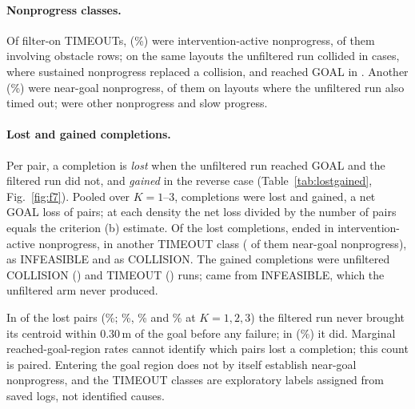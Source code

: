 \documentclass[journal]{IEEEtran}
\begin{document}
\paragraph{Nonprogress classes.} Of \TOonTotal{} filter-on TIMEOUTs, \TOfi{} (\TOfiPct\%) were
intervention-active nonprogress, \TOfiObst{} of them involving obstacle rows; on the same layouts the
unfiltered run collided in \TOfiOffColl{} cases, where sustained nonprogress replaced a collision, and
reached GOAL in \TOfiOffGoal. Another \TOng{} (\TOngPct\%) were near-goal nonprogress, \TOngOffTO{} of
them on layouts where the unfiltered run also timed out; \TOother{} were other nonprogress and \TOslow{}
slow progress.

\paragraph{Lost and gained completions.} Per pair, a completion is \emph{lost} when the unfiltered run
reached GOAL and the filtered run did not, and \emph{gained} in the reverse case
(Table~\ref{tab:lostgained}, Fig.~\ref{fig:f7}). Pooled over $K=1$--3, \LostTotalAll{}
completions were lost and \GainTotalAll{} gained, a net GOAL loss of \NetLossAll{} pairs; at each
density the net loss divided by the number of pairs equals the criterion (b) estimate. Of the lost
completions, \LostFIAll{} ended in intervention-active nonprogress, \LostOtherTOAll{} in another TIMEOUT class
(\LostNgAll{} of them near-goal nonprogress), \LostInfAll{} as INFEASIBLE and \LostCollAll{} as
COLLISION. The gained completions were unfiltered COLLISION (\GainCollAll) and TIMEOUT (\GainTOAll)
runs; \GainInfAll{} came from INFEASIBLE, which the unfiltered arm never produced.

In \LostRgrNoAll{} of the \LostTotalAll{} lost pairs (\LostRgrNoPctAll\%; \LostRgrNoPctone\%,
\LostRgrNoPcttwo\% and \LostRgrNoPctthree\% at $K=1,2,3$) the filtered run never brought its
centroid within 0.30\,m of the goal before any failure; in \LostRgrYesAll{} (\LostRgrYesPctAll\%) it
did. Marginal reached-goal-region rates cannot identify which pairs lost a completion; this count is
paired. Entering the goal region does not by itself establish near-goal nonprogress,
and the TIMEOUT classes are exploratory labels assigned from saved logs, not identified causes.
\end{document}

